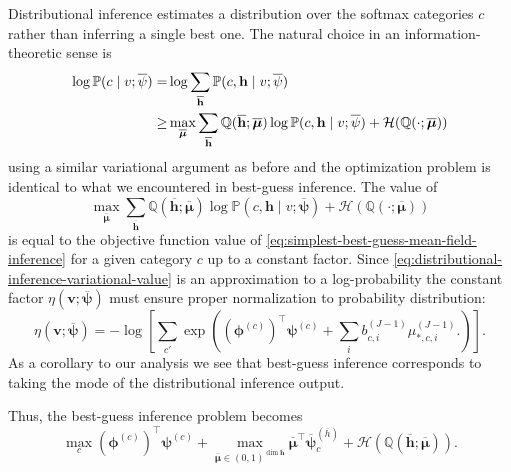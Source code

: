 \documentclass{article} %
\begin{document}
Distributional inference estimates a distribution over the softmax categories $c$ rather than inferring a single best one.  The natural
choice in an information-theoretic sense is
\begin{align}\label{eq:distributional-inference-variational-inequality}
\log \mathbb{P}(c \mid v; \overline{\mathbf{\psi}}) =& \log\sum_{\overline{\mathbf{h}}}\mathbb{P}(c, \mathbf{h} \mid v; \overline{\mathbf{\psi}})\notag\\
\geq&  \max_{\overline{\boldsymbol{\mu}}}\sum_{\overline{\mathbf{h}}} \mathbb{Q}(\overline{\mathbf{h}};\overline{\boldsymbol{\mu}})\log \mathbb{P}(c, \mathbf{h} \mid v; \overline{\mathbf{\psi}}) + \mathcal{H}(\mathbb{Q}(\cdot;\overline{\boldsymbol{\mu}}))
\end{align}
using a similar variational argument as before and the optimization problem is identical to what we encountered in best-guess inference.
The value of 
\begin{equation}\label{eq:distributional-inference-variational-value}
\max_{\overline{\boldsymbol{\mu}}}\sum_{\overline{\mathbf{h}}} \mathbb{Q}(\overline{\mathbf{h}};\overline{\boldsymbol{\mu}})\log \mathbb{P}(c, \mathbf{h} \mid v; \overline{\mathbf{\psi}}) + \mathcal{H}(\mathbb{Q}(\cdot;\overline{\boldsymbol{\mu}}))
\end{equation}
is equal to the objective function value of \autoref{eq:simplest-best-guess-mean-field-inference} for a given category $c$ up to a constant
factor.  Since \autoref{eq:distributional-inference-variational-value} is an approximation to a log-probability the constant factor $\eta(\mathbf{v};\overline{\boldsymbol{\psi}})$
must ensure proper normalization to probability distribution:
\begin{equation}\label{eq:distributional-inference-normalization-constant}
\eta(\mathbf{v};\overline{\boldsymbol{\psi}}) = -\log\left[\sum_{c'} \exp\left(\left(\boldsymbol{\phi}^{(c)}\right)^\top \boldsymbol{\psi}^{(c)} + \sum_i b_{c,i}^{(J-1)} \mu_{*,c,i}^{(J-1)}.\right)\right].
\end{equation}
As a corollary to our analysis we see that best-guess inference corresponds to taking the mode of the distributional inference output.


 Thus, the best-guess
inference problem becomes
\begin{equation}\label{eq:best-guess-mean-field-4}
\max_c \left(\boldsymbol{\phi}^{(c)}\right)^\top \boldsymbol{\psi}^{(c)} + \max_{\overline{\boldsymbol{\mu}}\in (0,1)^{\dim \overline{\mathbf{h}}}} \overline{\boldsymbol{\mu}}^\top \overline{\boldsymbol{\psi}}^{(\overline{h})}_c
 + \mathcal{H}(\mathbb{Q}(\overline{\mathbf{h}};\overline{\boldsymbol{\mu}})).
\end{equation}
\end{document}
